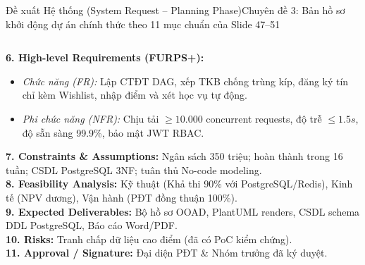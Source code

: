 \documentclass[aspectratio=169, 10pt]{beamer}
\begin{document}
\begin{frame}[t]{Đề xuất Hệ thống (System Request -- Planning Phase)}{Chuyên đề 3: Bản hồ sơ khởi động dự án chính thức theo 11 mục chuẩn của Slide 47--51}
\begin{columns}[T]
      \begin{neutralBox}
        \tiny
        \textbf{\color{NavyDark}6. High-level Requirements (FURPS+):}
        \begin{itemize}\itemsep0.5pt
          \item \textit{Chức năng (FR):} Lập CTĐT DAG, xếp TKB chống trùng kíp, đăng ký tín chỉ kèm Wishlist, nhập điểm và xét học vụ tự động.
          \item \textit{Phi chức năng (NFR):} Chịu tải $\ge 10.000$ concurrent requests, độ trễ $\le 1.5s$, độ sẵn sàng 99.9\%, bảo mật JWT RBAC.
        \end{itemize}
        \textbf{\color{NavyDark}7. Constraints \& Assumptions:} Ngân sách 350 triệu; hoàn thành trong 16 tuần; CSDL PostgreSQL 3NF; tuân thủ No-code modeling.\\
        \textbf{\color{NavyDark}8. Feasibility Analysis:} Kỹ thuật (Khả thi 90\% với PostgreSQL/Redis), Kinh tế (NPV dương), Vận hành (PĐT đồng thuận 100\%).\\
        \textbf{\color{NavyDark}9. Expected Deliverables:} Bộ hồ sơ OOAD, PlantUML renders, CSDL schema DDL PostgreSQL, Báo cáo Word/PDF.\\
        \textbf{\color{NavyDark}10. Risks:} Tranh chấp dữ liệu cao điểm (đã có PoC kiểm chứng).\\
        \textbf{\color{NavyDark}11. Approval / Signature:} Đại diện PĐT \& Nhóm trưởng đã ký duyệt.
      \end{neutralBox}
  \end{columns}
\end{frame}
\end{document}
